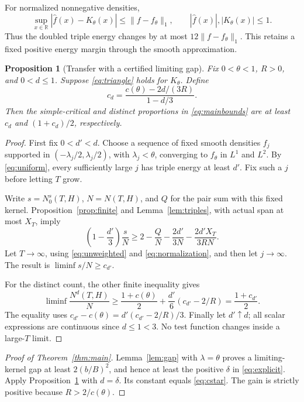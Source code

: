 \documentclass[11pt]{article}
\newtheorem{proposition}[theorem]{Proposition}
\theoremstyle{remark}
\newcommand{\R}{\mathbb R}
\begin{document}
For normalized nonnegative densities,
\begin{equation}\label{eq:uniform}
 \sup_{x\in\R}|\widehat f(x)-K_\theta(x)|\le\|f-f_\theta\|_1,
 \qquad |\widehat f(x)|,|K_\theta(x)|\le1.
\end{equation}
Thus the doubled triple energy changes by at most
$12\|f-f_\theta\|_1$. This retains a fixed positive energy margin
through the smooth approximation.

\begin{proposition}[Transfer with a certified limiting gap]\label{prop:transfer}
Fix $0<\theta<1$, $R>0$, and $0<d\le1$. Suppose \eqref{eq:triangle}
holds for $K_\theta$. Define
\[
 c_d=\frac{c(\theta)-2d/(3R)}{1-d/3}.
\]
Then the simple-critical and distinct proportions in \eqref{eq:mainbounds}
are at least $c_d$ and $(1+c_d)/2$, respectively.
\end{proposition}
\begin{proof}
First fix $0<d'<d$. Choose a sequence of fixed smooth densities $f_j$
supported in $(-\lambda_j/2,\lambda_j/2)$, with
$\lambda_j<\theta$, converging to $f_\theta$ in $L^1$ and $L^2$.
By \eqref{eq:uniform}, every sufficiently large $j$ has triple energy
at least $d'$. Fix such a $j$ before letting $T$ grow.

Write $s=N_0^s(T,H)$, $N=N(T,H)$, and $Q$ for the pair sum with this
fixed kernel. Proposition~\ref{prop:finite} and Lemma~\ref{lem:triples},
with actual span at most $X_T$, imply
\[
 \left(1-\frac{d'}3\right)\frac sN
 \ge2-\frac QN-\frac{2d'}{3N}-\frac{2d'X_T}{3RN}.
\]
Let $T\to\infty$, using \eqref{eq:unweighted} and
\eqref{eq:normalization}, and then let $j\to\infty$. The result is
$\liminf s/N\ge c_{d'}$.

For the distinct count, the other finite inequality gives
\[
 \liminf\frac{N^d(T,H)}N
 \ge\frac{1+c(\theta)}2+\frac{d'}6(c_{d'}-2/R)
 =\frac{1+c_{d'}}2.
\]
The equality uses $c_{d'}-c(\theta)=d'(c_{d'}-2/R)/3$.
Finally let $d'\uparrow d$; all scalar expressions are continuous since
$d\le1<3$. No test function changes inside a large-$T$ limit.
\end{proof}

\begin{proof}[Proof of Theorem~\ref{thm:main}]
Lemma~\ref{lem:gap} with $\lambda=\theta$ proves a limiting-kernel gap
at least $2(b/B)^2$, and hence at least the positive $\delta$ in
\eqref{eq:explicit}. Apply Proposition~\ref{prop:transfer} with
$d=\delta$. Its constant equals \eqref{eq:cstar}. The gain is strictly
positive because $R>2/c(\theta)$.
\end{proof}
\end{document}
